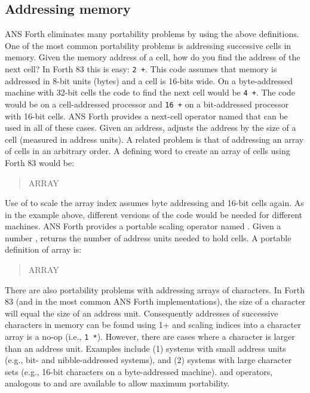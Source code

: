 \subsection{Addressing memory} %

ANS Forth eliminates many portability problems by using the above
definitions. One of the most common portability problems is addressing
successive cells in memory. Given the memory address of a cell, how
do you find the address of the next cell? In Forth 83 this is easy:
\texttt{2 +}. This code assumes that memory is addressed in 8-bit
units (bytes) and a cell is 16-bits wide. On a byte-addressed machine
with 32-bit cells the code to find the next cell would be \texttt{4 +}.
The code would be  on a cell-addressed processor and
\texttt{16 +} on a bit-addressed processor with 16-bit cells. ANS Forth
provides a next-cell operator named  that can be used in
all of these cases. Given an address,  adjusts the address
by the size of a cell (measured in address units). A related problem
is that of addressing an array of cells in an arbitrary order. A
defining word to create an array of cells using Forth 83 would be:
\begin{quote}\ttfamily
	\word{:} ARRAY ~  ~   ~
		   \word{+} \word{;}
\end{quote}
Use of  to scale the array index assumes byte addressing and
16-bit cells again. As in the example above, different versions of
the code would be needed for different machines. ANS Forth provides
a portable scaling operator named . Given a number ,
 returns the number of address units needed to hold 
cells. A portable definition of array is:
\begin{quote}\ttfamily
	\word{:} ARRAY ~  ~   \\
	\hspace*{2em}   \word{+} \word{;}
\end{quote}
There are also portability problems with addressing arrays of
characters. In Forth 83 (and in the most common ANS Forth
implementations), the size of a character will equal the size of an
address unit. Consequently addresses of successive characters in
memory can be found using 1+ and scaling indices into a character
array is a no-op (i.e., \texttt{1 *}). However, there are cases where
a character is larger than an address unit. Examples include (1)
systems with small address units (e.g., bit- and nibble-addressed
systems), and (2) systems with large character sets (e.g., 16-bit
characters on a byte-addressed machine).  and 
operators, analogous to  and  are available
to allow maximum portability.

